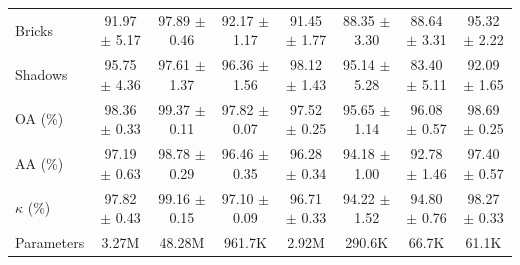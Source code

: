 \begin{table}[htbp]
{\begin{tabular}{l c c c c c c c}
    Bricks & 91.97 $\pm$ 5.17 & \textcolor{tgteal}{97.89 $\pm$ 0.46} & \textcolor{tgred}{92.17 $\pm$ 1.17} & 91.45 $\pm$ 1.77 & 88.35 $\pm$ 3.30 & 88.64 $\pm$ 3.31 & \textcolor{tgblue}{95.32 $\pm$ 2.22} \\
    Shadows & 95.75 $\pm$ 4.36 & \textcolor{tgblue}{97.61 $\pm$ 1.37} & \textcolor{tgred}{96.36 $\pm$ 1.56} & \textcolor{tgteal}{98.12 $\pm$ 1.43} & 95.14 $\pm$ 5.28 & 83.40 $\pm$ 5.11 & 92.09 $\pm$ 1.65 \\
    \midrule
    OA (\%) & \textcolor{tgred}{98.36 $\pm$ 0.33} & \textcolor{tgteal}{99.37 $\pm$ 0.11} & 97.82 $\pm$ 0.07 & 97.52 $\pm$ 0.25 & 95.65 $\pm$ 1.14 & 96.08 $\pm$ 0.57 & \textcolor{tgblue}{98.69 $\pm$ 0.25} \\
    AA (\%) & \textcolor{tgred}{97.19 $\pm$ 0.63} & \textcolor{tgteal}{98.78 $\pm$ 0.29} & 96.46 $\pm$ 0.35 & 96.28 $\pm$ 0.34 & 94.18 $\pm$ 1.00 & 92.78 $\pm$ 1.46 & \textcolor{tgblue}{97.40 $\pm$ 0.57} \\
    $\kappa$ (\%) & \textcolor{tgred}{97.82 $\pm$ 0.43} & \textcolor{tgteal}{99.16 $\pm$ 0.15} & 97.10 $\pm$ 0.09 & 96.71 $\pm$ 0.33 & 94.22 $\pm$ 1.52 & 94.80 $\pm$ 0.76 & \textcolor{tgblue}{98.27 $\pm$ 0.33} \\
    \midrule
    Parameters & 3.27M & 48.28M & 961.7K & 2.92M & 290.6K & 66.7K & 61.1K \\
    \bottomrule
  \end{tabular}%
  }
\end{table}

